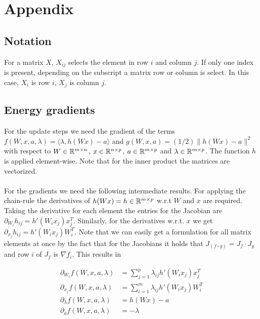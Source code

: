 \documentclass[english,11pt,a4paper]{article}
\newcommand\inner[2]{\langle #1, #2 \rangle}
\begin{document}
\section{Appendix}

\subsection{Notation}

For a matrix $X$, $X_{ij}$ selects the element in row $i$ and column $j$. If only one index is present, depending on the subscript a matrix row or column is select. In this case, $X_i$ is row $i$, $X_j$ is column $j$.

\subsection{Energy gradients}

For the update steps we need the gradient of the terms $f(W,x,a,\lambda) = \inner{\lambda}{h(Wx)-a}$ and $g(W,x,a) = (1/2) \| h(Wx) - a \|^2$ with respect to $W \in \mathbb{R}^{m \times n}$, $x \in \mathbb{R}^{n \times p}$, $a \in \mathbb{R}^{m \times p}$ and $\lambda \in \mathbb{R}^{m \times p}$. The function $h$ is applied element-wise. Note that for the inner product the matrices are vectorized. \\ \\
For the gradients we need the following intermediate results. For applying the chain-rule the derivatives of $h(Wx) = h \in \mathbb{R}^{m \times p}$ w.r.t $W$ and $x$ are required. Taking the derivative for each element the entries for the Jacobian are $\partial_{W_i}h_{ij} = h'(W_i x_j) x_j^T$. Similarly, for the derivatives w.r.t. $x$ we get $\partial_{x_j}h_{ij} = h'(W_i x_j) W_i^T $. Note that we can easily get a formulation for all matrix elements at once by the fact that for the Jacobians it holds that $J_{(f \circ g)} = J_f \cdot J_g$ and row $i$ of $J_f$ is $\nabla f_i$. This results in

\begin{equation}
	\begin{aligned}
		\partial_{W_i} f(W,x,a,\lambda) &= \sum_{j=1}^{p} \lambda_{ij} h'(W_i x_j) x_j^T \\
		\partial_{x_j} f(W,x,a,\lambda) &= \sum_{i=1}^{m} \lambda_{ij} h'(W_i x_j) W_i^T \\
		\partial_{\lambda} f(W,x,a,\lambda) &= h(W x) - a \\
		\partial_{a} f(W,x,a,\lambda) &= -\lambda
	\end{aligned}
\end{equation}
\end{document}
